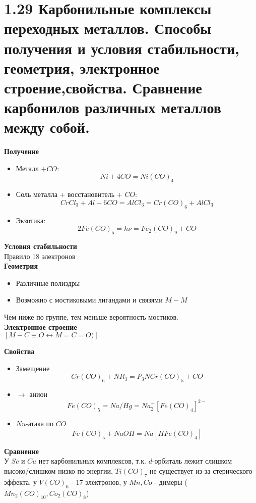 \section*{1.29 Карбонильные комплексы переходных металлов. Способы получения и условия стабильности, геометрия, электронное строение,свойства. Сравнение карбонилов различных металлов между собой.}
\textbf{Получение}\\
\begin{itemize}
	\item Металл $+ CO$:
	\[
	Ni + 4CO = Ni(CO)_4
	\]
	\item Соль металла + восстановитель + $CO$:
	\[
	CrCl_3 + Al + 6CO = AlCl_3 = Cr(CO)_6 + AlCl_3
	\]
	\item Экзотика: 
	\[
	2Fe(CO)_5 = h\nu = Fe_2(CO)_9 + CO
	\]
\end{itemize}
\textbf{Условия стабильности}\\
Правило 18 электронов \\
\textbf{Геометрия}\\
\begin{figure} [H]
	\centering {\texttt{[image: dd2]}}
\end{figure}
\begin{itemize}
	\item Различные полиэдры
	\item Возможно с мостиковыми лигандами и связями $M-M$
\end{itemize}
\begin{figure} [H]
	\centering {\texttt{[image: dd3]}}
\end{figure}
Чем ниже по группе, тем меньше вероятность мостиков. \\
\textbf{Электронное строение}\\
$\left[ M-C\equiv O \leftrightarrow M = C = O ) \right]$ \\
\begin{figure} [H]
	\centering {\texttt{[image: dd4]}}
\end{figure}
\textbf{Свойства}\\
\begin{itemize}
	\item Замещение
	\[
	Cr(CO)_6 + NR_3 = P_3NCr(CO)_5 + CO
	\]
	\item $\rightarrow $ анион
	\[
	Fe(CO)_5 = Na/Hg = Na_2^{+} \left[Fe(CO)_4 \right]^{2-}
 	\]
	\item $Nu$-атака по $CO$
	\[
	Fe(CO)_5 + NaOH = Na \left[ HFe(CO)_4 \right]
	\]
\end{itemize}
\textbf{Сравнение}\\
У $Sc$ и $Cu$ нет карбонильных комплексов, т.к. $d$-орбиталь лежит слишком высоко/слишком низко по энергии, $Ti(CO)_7$ не существует из-за стерического эффекта, у $V(CO)_6$ - $17$ электронов, у $Mn, Co$ - димеры ($Mn_2(CO)_{10}, Co_2(CO)_8$) 



